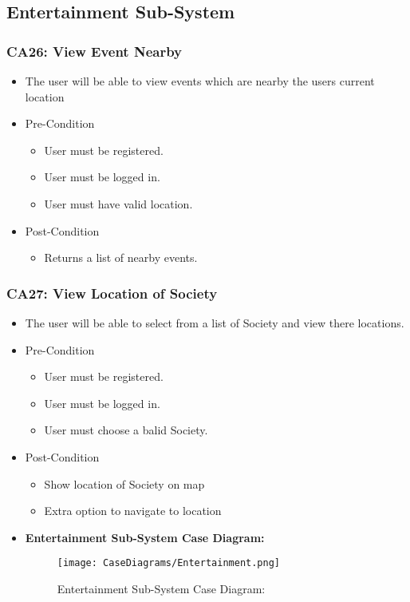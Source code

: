 \documentclass[12pt,a4paper]{article}
\begin{document}
	\subsection{Entertainment Sub-System}
		\subsubsection{CA26: View Event Nearby}
				\begin{itemize}
				\item The user will be able to view events which are nearby the users current location
					\item Pre-Condition
						\begin{itemize}
							\item User must be registered.
							\item User must be logged in.
							\item User must have valid location.
						\end{itemize}
					\item Post-Condition
						\begin{itemize}
							\item Returns a list of nearby events.
						\end{itemize}
				\end{itemize}
		\subsubsection{CA27: View Location of Society}
				\begin{itemize}
				\item The user will be able to select from a list of Society and view there locations.
					\item Pre-Condition
						\begin{itemize}
							\item User must be registered.
							\item User must be logged in.
							\item User must choose a balid Society.
						\end{itemize}
					\item Post-Condition
						\begin{itemize}
							\item Show location of Society on map
							\item Extra option to navigate to location
						\end{itemize}
				\end{itemize}
			\begin{itemize}
				\item \textbf{Entertainment Sub-System Case Diagram:}
				\begin{figure}[H]
					\texttt{[image: CaseDiagrams/Entertainment.png]}
					\caption{Entertainment Sub-System Case Diagram:}
				\end{figure}
			\end{itemize}
\end{document}
